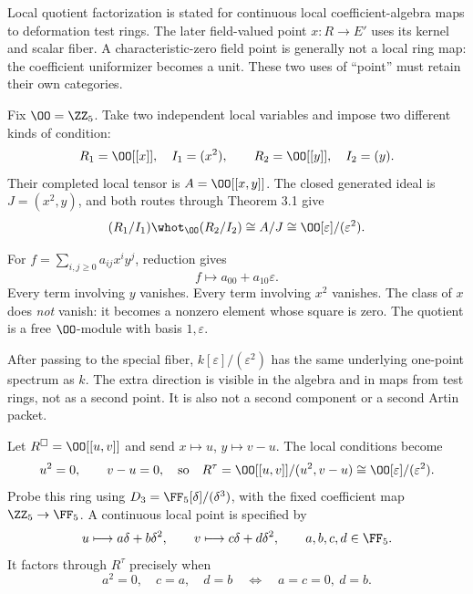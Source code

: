 Local quotient factorization is stated for continuous local coefficient-algebra maps to deformation test rings. The later field-valued point $x:R\to E'$ uses its kernel and scalar fiber. A characteristic-zero field point is generally not a local ring map: the coefficient uniformizer becomes a unit. These two uses of ``point'' must retain their own categories.

Fix $\OO=\ZZ_5$. Take two independent local variables and impose two different kinds of condition:
\[
R_1=\OO[[x]],\quad I_1=(x^2),\qquad
R_2=\OO[[y]],\quad I_2=(y).
\]
Their completed local tensor is $A=\OO[[x,y]]$. The closed generated ideal is $J=(x^2,y)$, and both routes through Theorem 3.1 give
\[
(R_1/I_1)\whot_{\OO}(R_2/I_2)
\cong A/J
\cong \OO[\varepsilon]/(\varepsilon^2).
\]


For $f=\sum_{i,j\ge0}a_{ij}x^iy^j$, reduction gives
\[
f\longmapsto a_{00}+a_{10}\varepsilon.
\]
Every term involving $y$ vanishes. Every term involving $x^2$ vanishes. The class of $x$ does \emph{not} vanish: it becomes a nonzero element whose square is zero. The quotient is a free $\OO$-module with basis $1,\varepsilon$.

After passing to the special fiber, $k[\varepsilon]/(\varepsilon^2)$ has the same underlying one-point spectrum as $k$. The extra direction is visible in the algebra and in maps from test rings, not as a second point. It is also not a second component or a second Artin packet.


Let $R^\square=\OO[[u,v]]$ and send $x\mapsto u$, $y\mapsto v-u$. The local conditions become
\[
u^2=0,\qquad v-u=0,
\quad\text{so}\quad
R^\tau=\OO[[u,v]]/(u^2,v-u)\cong\OO[\varepsilon]/(\varepsilon^2).
\]
Probe this ring using $D_3=\FF_5[\delta]/(\delta^3)$, with the fixed coefficient map $\ZZ_5\to\FF_5$. A continuous local point is specified by
\[
u\longmapsto a\delta+b\delta^2,\qquad
v\longmapsto c\delta+d\delta^2,
\qquad a,b,c,d\in\FF_5.
\]
It factors through $R^\tau$ precisely when
\[
a^2=0,\quad c=a,\quad d=b
\quad\Longleftrightarrow\quad a=c=0,\ d=b.
\]

